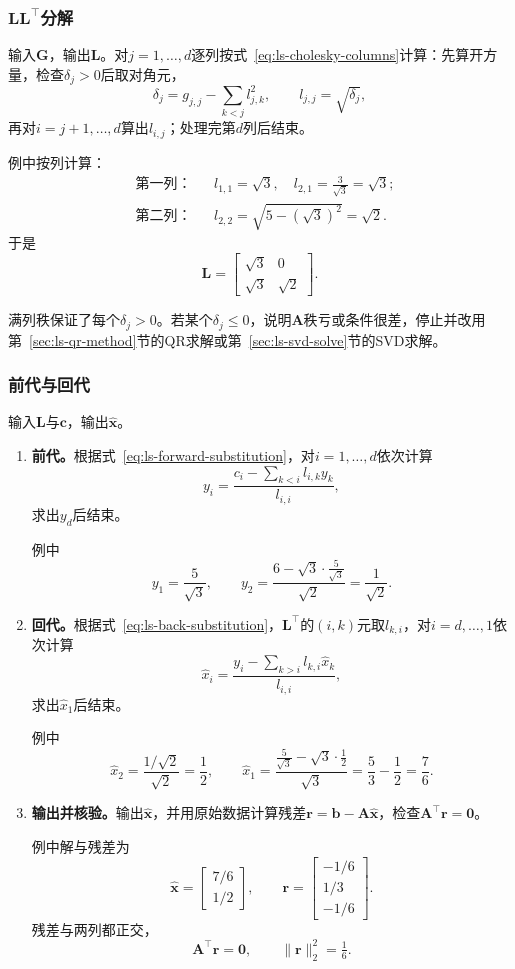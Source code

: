\subsubsection{\texorpdfstring{$\bm L\bm L^\top$}{LLT}分解}
输入$\bm G$，输出$\bm L$。对$j=1,\ldots,d$逐列按式~\eqref{eq:ls-cholesky-columns}计算：先算开方量，检查$\delta_j>0$后取对角元，
\[
 \delta_j=g_{j,j}-\sum_{k<j}l_{j,k}^2,\qquad l_{j,j}=\sqrt{\delta_j},
\]
再对$i=j+1,\ldots,d$算出$l_{i,j}$；处理完第$d$列后结束。

例中按列计算：
\[
 \begin{aligned}
 &\text{第一列：}&& l_{1,1}=\sqrt3,\quad l_{2,1}=\tfrac{3}{\sqrt3}=\sqrt3;\\
 &\text{第二列：}&& l_{2,2}=\sqrt{5-(\sqrt3)^2}=\sqrt2 .
 \end{aligned}
\]
于是
\[
 \bm L=\begin{bmatrix}\sqrt3&0\\\sqrt3&\sqrt2\end{bmatrix}.
\]

满列秩保证了每个$\delta_j>0$。若某个$\delta_j\leq0$，说明$\bm A$秩亏或条件很差，停止并改用第~\ref{sec:ls-qr-method}节的QR求解或第~\ref{sec:ls-svd-solve}节的SVD求解。

\subsubsection{前代与回代}
输入$\bm L$与$\bm c$，输出$\hat{\bm x}$。
\begin{enumerate}
 \item \textbf{前代。}根据式~\eqref{eq:ls-forward-substitution}，对$i=1,\ldots,d$依次计算
 \[
  y_i=\frac{c_i-\sum_{k<i}l_{i,k}y_k}{l_{i,i}} ,
 \]
 求出$y_d$后结束。
 
 例中
 \[
  y_1=\frac{5}{\sqrt3},\qquad
  y_2=\frac{6-\sqrt3\cdot\frac5{\sqrt3}}{\sqrt2}=\frac1{\sqrt2}.
 \]

 \item \textbf{回代。}根据式~\eqref{eq:ls-back-substitution}，$\bm L^\top$的$(i,k)$元取$l_{k,i}$，对$i=d,\ldots,1$依次计算
 \[
  \hat x_i=\frac{y_i-\sum_{k>i}l_{k,i}\hat x_k}{l_{i,i}} ,
 \]
 求出$\hat x_1$后结束。
 
 例中
 \[
  \hat x_2=\frac{1/\sqrt2}{\sqrt2}=\frac12,\qquad
  \hat x_1=\frac{\frac5{\sqrt3}-\sqrt3\cdot\frac12}{\sqrt3}=\frac53-\frac12=\frac76 .
 \]

 \item \textbf{输出并核验。}输出$\hat{\bm x}$，并用原始数据计算残差$\bm r=\bm b-\bm A\hat{\bm x}$，检查$\bm A^\top\bm r=\bm0$。
 
 例中解与残差为
 \[
  \hat{\bm x}=\begin{bmatrix}7/6\\1/2\end{bmatrix},\qquad
  \bm r=\begin{bmatrix}-1/6\\1/3\\-1/6\end{bmatrix}.
 \]
 残差与两列都正交，
 \[
  \bm A^\top\bm r=\bm0,\qquad \lVert\bm r\rVert_2^2=\tfrac16 .
 \]
\end{enumerate}

